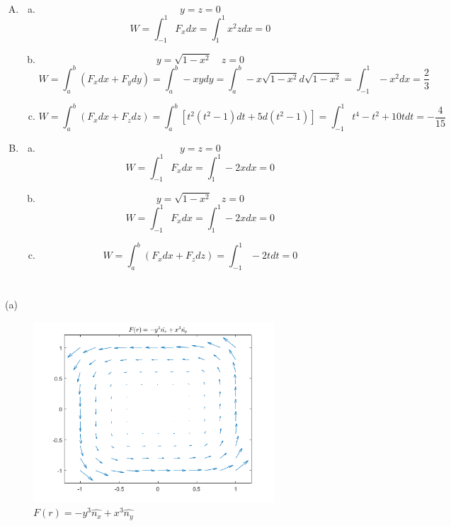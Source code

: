 \documentclass{article}
\begin{document}
\section{}
\begin{enumerate}[(A)]
	\item
	\begin{enumerate}[(a)]
		\item
		$$y=z=0$$
		$$W=\int_{-1}^1F_xdx=\int_{1}^1x^2zdx=0$$
		\item
		$$y=\sqrt{1-x^2}\quad z=0$$
		$$W=\int_a^b(F_xdx+F_ydy)=\int_a^b-xydy=\int_a^b-x\sqrt{1-x^2}d\sqrt{1-x^2}=\int_{-1}^1-x^2dx=\frac{2}{3}$$
		\item
		$$W=\int_a^b(F_xdx+F_zdz)=\int_a^b[t^2(t^2-1)dt+5d(t^2-1)]=\int_{-1}^1t^4-t^2+10tdt=-\frac{4}{15}$$
	\end{enumerate}
	\item
	\begin{enumerate}[(a)]
		\item
		$$y=z=0$$
		$$W=\int_{-1}^1F_xdx=\int_{1}^1-2xdx=0$$
		\item
		$$y=\sqrt{1-x^2}\quad z=0$$
		$$W=\int_{-1}^1F_xdx=\int_{1}^1-2xdx=0$$		
		\item
		$$W=\int_a^b(F_xdx+F_zdz)=\int_{-1}^1-2tdt=0$$
	\end{enumerate}
\end{enumerate}

\section{}
	\indent
	
	(a)
	\begin{figure}[h!]
		\centering
		\includegraphics[width=9cm]{p9_1.png}
		\caption{$F(r)=-y^3\hat{n_x}+x^3\hat{n_y}$}
		\label{fig-9-a}
	\end{figure}
	
\end{document}
